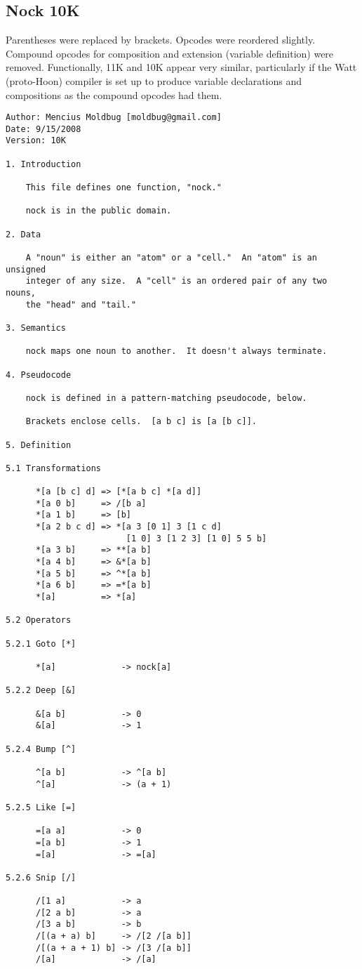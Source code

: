 \documentclass[twoside]{article}
\begin{document}
\subsection{Nock 10K}

Parentheses were replaced by brackets.  Opcodes were reordered slightly.  Compound opcodes for composition and extension (variable definition) were removed.  Functionally, 11K and 10K appear very similar, particularly if the Watt (proto-Hoon) compiler is set up to produce variable declarations and compositions as the compound opcodes had them.

\begin{lstlisting}[label=lst:nock10k,caption={Nock 10K, 15 September 2008.},style=listingcode]
Author: Mencius Moldbug [moldbug@gmail.com]
Date: 9/15/2008
Version: 10K

1. Introduction

    This file defines one function, "nock."

    nock is in the public domain.

2. Data

    A "noun" is either an "atom" or a "cell."  An "atom" is an unsigned
    integer of any size.  A "cell" is an ordered pair of any two nouns,
    the "head" and "tail."

3. Semantics

    nock maps one noun to another.  It doesn't always terminate.

4. Pseudocode

    nock is defined in a pattern-matching pseudocode, below.

    Brackets enclose cells.  [a b c] is [a [b c]].

5. Definition

5.1 Transformations

      *[a [b c] d] => [*[a b c] *[a d]]
      *[a 0 b]     => /[b a]
      *[a 1 b]     => [b]
      *[a 2 b c d] => *[a 3 [0 1] 3 [1 c d]
                        [1 0] 3 [1 2 3] [1 0] 5 5 b]
      *[a 3 b]     => **[a b]
      *[a 4 b]     => &*[a b]
      *[a 5 b]     => ^*[a b]
      *[a 6 b]     => =*[a b]
      *[a]         => *[a]

5.2 Operators

5.2.1 Goto [*]

      *[a]             -> nock[a]

5.2.2 Deep [&]

      &[a b]           -> 0
      &[a]             -> 1

5.2.4 Bump [^]

      ^[a b]           -> ^[a b]
      ^[a]             -> (a + 1)

5.2.5 Like [=]

      =[a a]           -> 0
      =[a b]           -> 1
      =[a]             -> =[a]

5.2.6 Snip [/]

      /[1 a]           -> a
      /[2 a b]         -> a
      /[3 a b]         -> b
      /[(a + a) b]     -> /[2 /[a b]]
      /[(a + a + 1) b] -> /[3 /[a b]]
      /[a]             -> /[a]
\end{lstlisting}
\end{document}

